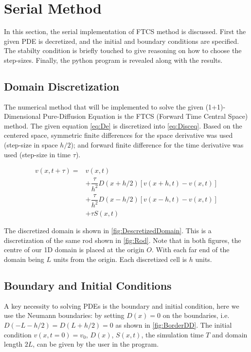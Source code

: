 \section{Serial Method}
In this section, the serial implementation of FTCS method is discussed. First the given PDE is decretized, and the initial and boundary conditions are specified. The stabilty condition is briefly touched to give reasoning on how to choose the step-sizes. Finally, the python program is revealed along with the results.
\subsection{Domain Discretization}
The numerical method that will be implemented to solve the given (1+1)-Dimensional Pure-Diffusion Equation is the FTCS (Forward Time Central Space) method. The given equation \autoref{eq:De} is discretized into \autoref{eq:Disceq}. Based on the centered space, symmetric finite differences for the space derivative was used (step-size in space $h/2$); and forward finite difference for the time derivative was used (step-size in time $\tau$).

\begin{equation}
\begin{aligned}
    v(x,t+\tau) = &v(x,t) \\
     &+ \dfrac{\tau}{h^2}D(x+h/2)[v(x+h,t) - v(x,t)] \\
     &+ \dfrac{\tau}{h^2}D(x-h/2)[v(x-h,t) - v(x,t)] \\
     &+ \tau S(x,t)
\end{aligned}
\label{eq:Disceq}
\end{equation}

The discretized domain is shown in \autoref{fig:DescretizedDomain}. This is a discretization of the same rod shown in \autoref{fig:Rod}. Note that in both figures, the centre of our 1D domain is placed at the origin $O$. With each far end of the domain being $L$ units from the origin. Each discretized cell is $h$ units.
\figDescretizedDomain

\subsection{Boundary and Initial Conditions}
\label{subsec:bic}
A key necessity to solving PDEs is the boundary and initial condition, here we use the Neumann boundaries: by setting $D(x)=0$ on the boundaries, i.e. $D(-L-h/2)=D(L+h/2)=0$ as shown in \autoref{fig:BorderDD}. The initial condition $v(x,t=0)=v_0$, $D(x)$, $S(x,t)$, the simulation time $T$ and domain length $2L$, can be given by the user in the program.

